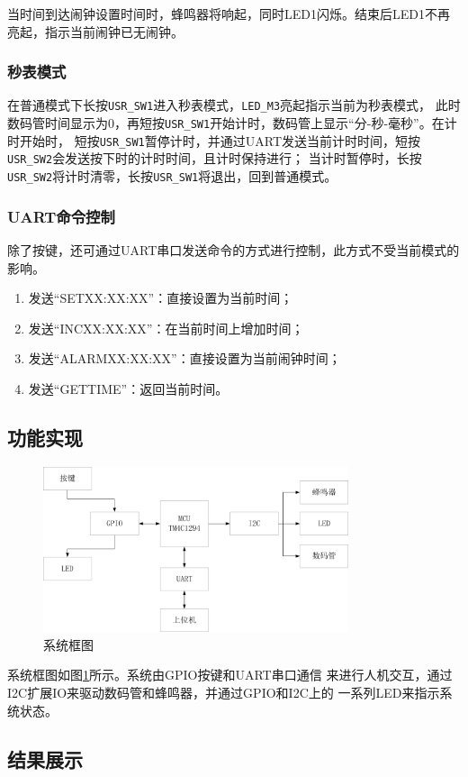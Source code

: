 \documentclass[12pt, a4paper, oneside]{ctexart}
\begin{document}
    当时间到达闹钟设置时间时，蜂鸣器将响起，同时LED1闪烁。结束后LED1不再亮起，指示当前闹钟已无闹钟。
    \subsubsection{秒表模式}
    在普通模式下长按\verb|USR_SW1|进入秒表模式，\verb|LED_M3|亮起指示当前为秒表模式，
    此时数码管时间显示为0，再短按\verb|USR_SW1|开始计时，数码管上显示“分-秒-毫秒”。在计时开始时，
    短按\verb|USR_SW1|暂停计时，并通过UART发送当前计时时间，短按\verb|USR_SW2|会发送按下时的计时时间，且计时保持进行；
    当计时暂停时，长按\verb|USR_SW2|将计时清零，长按\verb|USR_SW1|将退出，回到普通模式。
    \subsubsection{UART命令控制}
    除了按键，还可通过UART串口发送命令的方式进行控制，此方式不受当前模式的影响。
    \begin{enumerate}
        \item 发送“SETXX:XX:XX”：直接设置为当前时间；
        \item 发送“INCXX:XX:XX”：在当前时间上增加时间；
        \item 发送“ALARMXX:XX:XX”：直接设置为当前闹钟时间；
        \item 发送“GETTIME”：返回当前时间。
    \end{enumerate}
    \subsection{功能实现}
    \begin{figure}[h]
        \centering
        \includegraphics[width=0.8\textwidth]{./img/system.png}
        \caption{系统框图}
        \label{fig:system}
    \end{figure}
    系统框图如图\ref{fig:system}所示。系统由GPIO按键和UART串口通信
    来进行人机交互，通过I2C扩展IO来驱动数码管和蜂鸣器，并通过GPIO和I2C上的
    一系列LED来指示系统状态。



    

    \subsection{结果展示}
     
\end{document}
